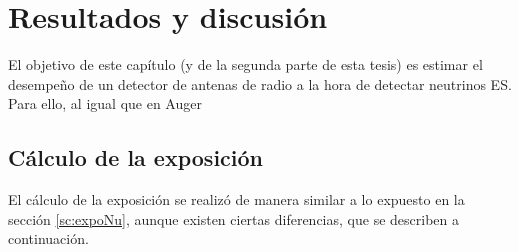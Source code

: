 \chapter{Resultados y discusi\'on}
\label{ch:resultadosRadio}

El objetivo de este cap\'itulo (y de la segunda parte de esta tesis) es estimar el desempe\~no  de un detector de antenas de radio a la hora de detectar neutrinos ES.
Para ello, al igual que en Auger 

\section{C\'alculo de la exposici\'on}
	
	El c\'alculo de la exposici\'on se realiz\'o de manera similar a lo expuesto en la secci\'on \ref{sc:expoNu}, aunque existen ciertas diferencias, que se describen a continuaci\'on.

